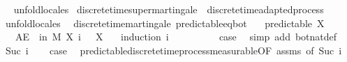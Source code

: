 \begin{isabellebody}
\isadelimproof
\ %
\endisadelimproof
%
\isatagproof
{}\isamarkupfalse%
\ {\isacharparenleft}{\kern0pt}unfold{\isacharunderscore}{\kern0pt}locales{\isacharparenright}{\kern0pt}%
\endisatagproof
{\isafoldproof}%
%
\isadelimproof
%
\endisadelimproof
\isanewline
{}\isamarkupfalse%
\ discrete{\isacharunderscore}{\kern0pt}time{\isacharunderscore}{\kern0pt}supermartingale\ {\isasymsubseteq}\ discrete{\isacharunderscore}{\kern0pt}time{\isacharunderscore}{\kern0pt}adapted{\isacharunderscore}{\kern0pt}process%
\isadelimproof
\ %
\endisadelimproof
%
\isatagproof
{}\isamarkupfalse%
\ {\isacharparenleft}{\kern0pt}unfold{\isacharunderscore}{\kern0pt}locales{\isacharparenright}{\kern0pt}%
\endisatagproof
{\isafoldproof}%
%
\isadelimproof
%
\endisadelimproof
%
\isadelimdocument
%
\endisadelimdocument
%
\isatagdocument
%
\isamarkuptrue%
%
\endisatagdocument
{\isafolddocument}%
%
\isadelimdocument
%
\endisadelimdocument
{}\isamarkupfalse%
\ {\isacharparenleft}{\kern0pt}\ discrete{\isacharunderscore}{\kern0pt}time{\isacharunderscore}{\kern0pt}martingale{\isacharparenright}{\kern0pt}\ predictable{\isacharunderscore}{\kern0pt}eq{\isacharunderscore}{\kern0pt}bot{\isacharcolon}{\kern0pt}\isanewline
\ \ \ {\isachardoublequoteopen}predictable\ X{\isachardoublequoteclose}\isanewline
\ \ \ {\isachardoublequoteopen}AE\ {\isasymxi}\ in\ M{\isachardot}{\kern0pt}\ X\ i\ {\isasymxi}\ {\isacharequal}{\kern0pt}\ X\ {\isasymbottom}\ {\isasymxi}{\isachardoublequoteclose}\isanewline
%
\isadelimproof
%
\endisadelimproof
%
\isatagproof
{}\isamarkupfalse%
\ {\isacharparenleft}{\kern0pt}induction\ i{\isacharparenright}{\kern0pt}\isanewline
\ \ \isamarkupfalse%
\ {}\isanewline
\ \ \isamarkupfalse%
\ \isamarkupfalse%
\ {\isacharquery}{\kern0pt}case\ \isamarkupfalse%
\ {\isacharparenleft}{\kern0pt}simp\ add{\isacharcolon}{\kern0pt}\ bot{\isacharunderscore}{\kern0pt}nat{\isacharunderscore}{\kern0pt}def{\isacharparenright}{\kern0pt}\isanewline
{}\isamarkupfalse%
\isanewline
\ \ \isamarkupfalse%
\ {\isacharparenleft}{\kern0pt}Suc\ i{\isacharparenright}{\kern0pt}\isanewline
\ \ \isamarkupfalse%
\ {\isacharquery}{\kern0pt}case\ \isamarkupfalse%
\ predictable{\isacharunderscore}{\kern0pt}discrete{\isacharunderscore}{\kern0pt}time{\isacharunderscore}{\kern0pt}process{\isacharunderscore}{\kern0pt}measurable{\isacharbrackleft}{\kern0pt}OF\ assms{\isacharcomma}{\kern0pt}\ of\ {\isachardoublequoteopen}Suc\ i{\isachardoublequoteclose}{\isacharbrackright}{\kern0pt}\ \isanewline

\end{isabellebody}
